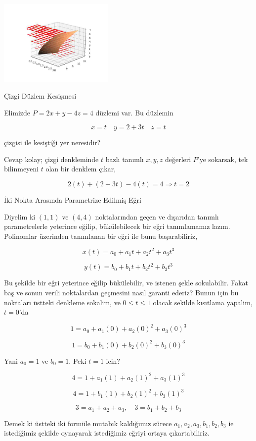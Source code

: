 \documentclass[12pt,fleqn]{article}\usepackage{../../common}
\begin{document}
\includegraphics[width=15em]{calc_multi_75_app_03.jpg}

Çizgi Düzlem Kesişmesi

Elimizde $P = 2x + y - 4z = 4$ düzlemi var. Bu düzlemin 

$$ x = t \quad y = 2 + 3t \quad z = t$$

çizgisi ile kesiştiği yer neresidir? 

Cevap kolay; çizgi denkleminde $t$ bazlı tanımlı $x,y,z$ değerleri $P$'ye
sokarsak, tek bilinmeyeni $t$ olan bir denklem çıkar, 

$$ 2(t) + (2+3t)-4(t) = 4 \Rightarrow t = 2$$

İki Nokta Arasında Parametrize Edilmiş Eğri

Diyelim ki $(1,1)$ ve $(4,4)$ noktalarından geçen ve dışarıdan tanımlı
parametrelerle yeterince eğilip, bükülebilecek bir eğri tanımlamamız
lazım. Polinomlar üzerinden tanımlanan bir eğri ile bunu başarabiliriz, 

$$
x(t) = a_0 + a_1 t + a_2 t^2 + a_3 t^3
$$

$$
y(t) = b_0 + b_1 t + b_2 t^2 + b_3 t^3
$$

Bu şekilde bir eğri yeterince eğilip bükülebilir, ve istenen şekle
sokulabilir. Fakat baş ve sonun verili noktalardan geçmesini nasıl garanti
ederiz? Bunun için bu noktaları üstteki denkleme sokalim, ve $0 \le t \le
1$ olacak sekilde kısıtlama yapalim, $t=0$'da

$$
1 = a_0 + a_1 (0) + a_2 (0)^2 + a_3 (0)^3
$$

$$
1 = b_0 + b_1 (0) + b_2 (0)^2 + b_3 (0)^3
$$

Yani  $a_0=1$ ve $b_0=1$. Peki $t=1$ icin?

$$
4 = 1 + a_1 (1) + a_2 (1)^2 + a_3 (1)^3 
$$

$$
4 = 1 + b_1 (1) + b_2 (1)^2 + b_3 (1)^3 
$$

$$
3 = a_1 + a_2 + a_3, \quad 3 = b_1 + b_2 + b_3
$$

Demek ki üstteki iki formüle mutabık kaldığımız sürece
$a_1,a_2,a_3,b_1,b_2,b_3$ ie istediğimiz şekilde oynayarak istediğimiz
eğriyi ortaya çıkartabiliriz. 
\end{document}
